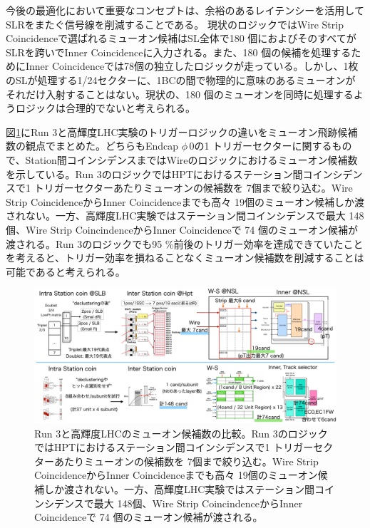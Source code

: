 今後の最適化において重要なコンセプトは、余裕のあるレイテンシーを活用してSLRをまたぐ信号線を削減することである。
現状のロジックではWire Strip Coincidenceで選ばれるミューオン候補はSL全体で180 個におよびそのすべてがSLRを跨いでInner Coincidenceに入力される。また、180 個の候補を処理するためにInner Coincidenceでは78個の独立したロジックが走っている。しかし、1枚のSLが処理する1/24セクターに、1BCの間で物理的に意味のあるミューオンがそれだけ入射することはない。現状の、180 個のミューオンを同時に処理するようロジックは合理的でないと考えられる。

図\ref{SL_Trigger_Compare}にRun 3と高輝度LHC実験のトリガーロジックの違いをミューオン飛跡候補数の観点でまとめた。どちらもEndcap $\phi\,$0の1 トリガーセクターに関するもので、Station間コインシデンスまではWireのロジックにおけるミューオン候補数を示している。Run 3のロジックではHPTにおけるステーション間コインシデンスで1 トリガーセクターあたりミューオンの候補数を 7個まで絞り込む。Wire Strip CoincidenceからInner Coincidenceまでも高々 19個のミューオン候補しか渡されない。一方、高輝度LHC実験ではステーション間コインシデンスで最大 148個、Wire Strip CoincindenceからInner Coincidenceで 74 個のミューオン候補が渡される。Run 3のロジックでも95 \%前後のトリガー効率を達成できていたことを考えると、トリガー効率を損ねることなくミューオン候補数を削減することは可能であると考えられる。

\begin{figure} 
\centering
\includegraphics[width=16cm]{fig/SL/Trigger_Compare.png}
\caption[Run 3と高輝度LHCのミューオン候補数の比較]{Run 3と高輝度LHCのミューオン候補数の比較。Run 3のロジックではHPTにおけるステーション間コインシデンスで1 トリガーセクターあたりミューオンの候補数を 7個まで絞り込む。Wire Strip CoincidenceからInner Coincidenceまでも高々 19個のミューオン候補しか渡されない。一方、高輝度LHC実験ではステーション間コインシデンスで最大 148個、Wire Strip CoincindenceからInner Coincidenceで 74 個のミューオン候補が渡される。}
\label{SL_Trigger_Compare}
\end{figure}

